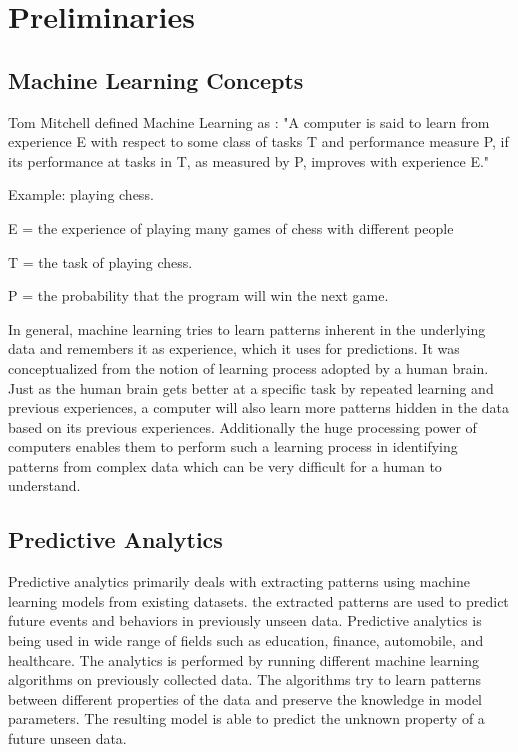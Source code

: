 \documentclass[11pt,openright]{report}
\begin{document}
\section{Preliminaries}\label{section:preliminaries}

\subsection{Machine Learning Concepts}

\noindent  Tom Mitchell defined Machine Learning as \cite{Mitchell1997}: 
\newline\newline
\hangindent=0.7cm "A computer is said to learn from experience E with respect to some class of tasks T and performance measure P, if its performance at tasks in T, as measured by P, improves with experience E." \newline 

\noindent Example: playing chess.

\noindent E = the experience of playing many games of chess with different people

\noindent T = the task of playing chess.

\noindent P = the probability that the program will win the next game.\newline 

\noindent In general, machine learning tries to learn patterns inherent in the underlying data and remembers it as experience, which it uses for predictions. It was conceptualized from the notion of learning process adopted by a human brain. Just as the human brain gets better at a specific task by repeated learning and previous experiences, a computer will also learn more patterns hidden in the data based on its previous experiences. Additionally the huge processing power of computers enables them to perform such a learning process in identifying patterns from complex data which can be very difficult for a human to understand. 

\subsection{Predictive Analytics}
Predictive analytics primarily deals with extracting patterns using machine learning models from existing datasets. the extracted patterns are used to predict future events and behaviors in previously unseen data. Predictive analytics is being used in wide range of fields such as education, finance, automobile, and healthcare. The analytics is performed by running different machine learning algorithms on previously collected data. The algorithms try to learn patterns between different properties of the data and preserve the knowledge in model parameters. The resulting model is able to predict the unknown property of a future unseen data.
\end{document}
